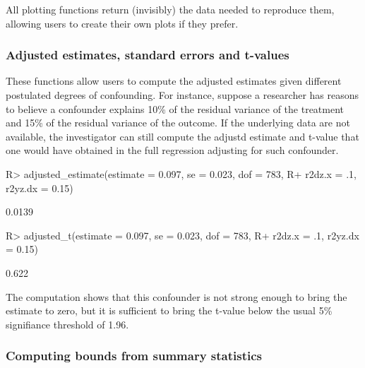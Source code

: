 \documentclass[
]{jss}
\begin{document}
All plotting functions return (invisibly) the data needed to reproduce
them, allowing users to create their own plots if they prefer.

\hypertarget{adjusted-estimates-standard-errors-and-t-values}{%
\subsubsection{Adjusted estimates, standard errors and
t-values}\label{adjusted-estimates-standard-errors-and-t-values}}

These functions allow users to compute the adjusted estimates given
different postulated degrees of confounding. For instance, suppose a
researcher has reasons to believe a confounder explains 10\% of the
residual variance of the treatment and 15\% of the residual variance of
the outcome. If the underlying data are not available, the investigator
can still compute the adjustd estimate and t-value that one would have
obtained in the full regression adjusting for such confounder.

\begin{CodeChunk}

\begin{CodeInput}
R> adjusted_estimate(estimate = 0.097, se = 0.023, dof = 783, 
R+                   r2dz.x = .1, r2yz.dx = 0.15)
\end{CodeInput}

\begin{CodeOutput}
[1] 0.0139
\end{CodeOutput}

\begin{CodeInput}
R> adjusted_t(estimate = 0.097, se = 0.023, dof = 783, 
R+            r2dz.x = .1, r2yz.dx = 0.15)
\end{CodeInput}

\begin{CodeOutput}
[1] 0.622
\end{CodeOutput}
\end{CodeChunk}

The computation shows that this confounder is not strong enough to bring
the estimate to zero, but it is sufficient to bring the t-value below
the usual 5\% signifiance threshold of 1.96.

\hypertarget{computing-bounds-from-summary-statistics}{%
\subsubsection{Computing bounds from summary
statistics}\label{computing-bounds-from-summary-statistics}}
\end{document}
